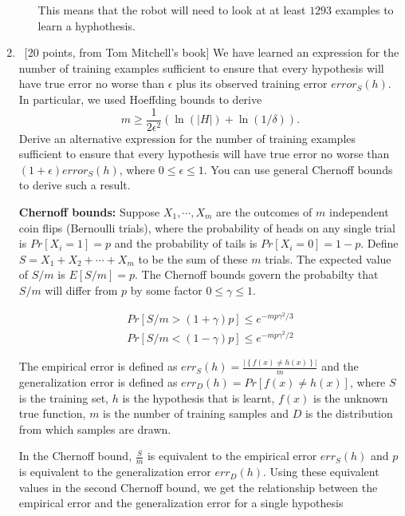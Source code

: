 \begin{enumerate}
\begin{itemize}
This means that the robot will need to look at at least $1293$ examples to learn a hyphothesis.

\end{itemize}


\item ~[20 points, from Tom Mitchell's book] We have learned an
  expression for the number of training examples sufficient to ensure
  that every hypothesis will have true error no worse than $\epsilon$
  plus its observed training error $error_S(h)$. In particular, we
  used Hoeffding bounds to derive
\[
	m \geq  \frac{1}{2 \epsilon^2}(\ln(|H|) + \ln(1/\delta)).
\]
Derive an alternative expression for the number of training examples
sufficient to ensure that every hypothesis will have true error no
worse than $(1+\epsilon)error_S(h)$, where $0 \leq \epsilon \leq 1$. You can use general Chernoff bounds
to derive such a result.

{\bf Chernoff bounds:} Suppose $X_1, \cdots, X_m$ are the outcomes of $m$ independent coin flips (Bernoulli trials), where the probability of heads on any single trial is $Pr[X_i = 1] = p$ and the probability of tails is $Pr[X_i = 0] = 1 - p$. Define $S = X_1 + X_2 + \cdots + X_m$ to be the sum of these $m$ trials. The expected value of $S/m$ is $E[S/m] = p$. The Chernoff bounds govern the probabilty that $S/m$ will differ from $p$ by some factor $0 \leq \gamma \leq 1$.

\begin{equation}
    \begin{array}{rcl}
	Pr[S/m > (1 + \gamma) p ] \leq e^{{-mp\gamma^2}/3}\\
	Pr[S/m < (1 - \gamma) p ] \leq e^{{-mp\gamma^2}/2}
	\end{array}
\end{equation}

The empirical error is defined as $err_S(h) = \frac{\left | \left \{ f(x) \neq h(x) \right \} \right |}{m}$ and the generalization error is defined as $err_D(h) =  Pr \left [ f(x) \neq h(x) \right ]$, where $S$ is the training set, $h$ is the hypothesis that is learnt, $f(x)$ is the unknown true function, $m$ is the number of training samples and $D$ is the distribution from which samples are drawn.

In the Chernoff bound, $\frac{S}{m}$ is equivalent to the empirical error $err_S(h)$ and $p$ is equivalent to the generalization error $err_D(h)$. Using these equivalent values in the second Chernoff bound, we get the relationship between the empirical error and the generalization error for a single hypothesis


\end{enumerate}
